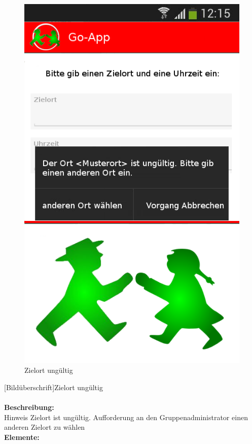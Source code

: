 \begin{figure}[H]
	\caption{Zielort ungültig}
\begin{center}
	\includegraphics[scale =0.5]{resources/images/treffpunkt_erstellen_ungueltig_Ort.png}
\end{center}
\end{figure}
[Bildüberschrift]Zielort ungültig\\ \\
\textbf{Beschreibung:}\\
Hinweis Zielort ist ungültig. Aufforderung an den Gruppenadministrator einen anderen Zielort zu wählen\\
\textbf{Elemente:}\\
